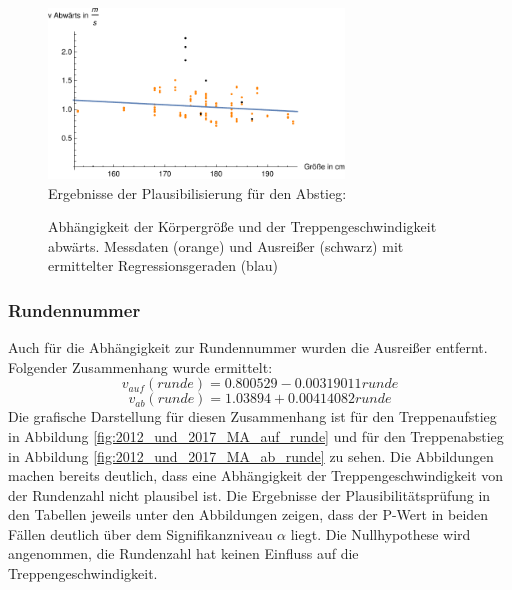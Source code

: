 	
	
	\begin{figure}[htpb]
		\centering
		\includegraphics[width=0.7\textwidth]{abbildungen/regression/2012_2017_verbund/ohneausreisser/ab-groesse.pdf}
		\justify \ \\
		Ergebnisse der Plausibilisierung für den Abstieg:
		
		\caption{Abhängigkeit der Körpergröße und der Treppengeschwindigkeit abwärts. Messdaten (orange) und Ausreißer (schwarz) mit ermittelter Regressionsgeraden (blau)}
		\label{fig:2012_und_2017_MA_ab_groesse}
	\end{figure}
	
	
	
	
	
	
	
	
	
	
	
	
	
	
	
	
	
	
	
	
	\subsubsection{Rundennummer}
	Auch für die Abhängigkeit zur Rundennummer wurden die Ausreißer entfernt. Folgender Zusammenhang wurde ermittelt:
	\begin{equation}
	v_{auf}(runde) = 0.800529 -0.00319011 runde
	\label{eq:2012_2017_AufRunde_MA}
	\end{equation}
	\begin{equation}
	v_{ab}(runde) = 1.03894 + 0.00414082 runde
	\label{eq:2012_2017_AbRunde_MA}
	\end{equation}
	Die grafische Darstellung für diesen Zusammenhang ist für den Treppenaufstieg in Abbildung \ref{fig:2012_und_2017_MA_auf_runde} und für den Treppenabstieg in Abbildung \ref{fig:2012_und_2017_MA_ab_runde} zu sehen. Die Abbildungen machen bereits deutlich, dass eine Abhängigkeit der Treppengeschwindigkeit von der Rundenzahl nicht plausibel ist. Die Ergebnisse der Plausibilitätsprüfung in den Tabellen jeweils unter den Abbildungen zeigen, dass der P-Wert in beiden Fällen deutlich über dem Signifikanzniveau $\alpha$ liegt. Die Nullhypothese wird angenommen, die Rundenzahl hat keinen Einfluss auf die Treppengeschwindigkeit.
	
